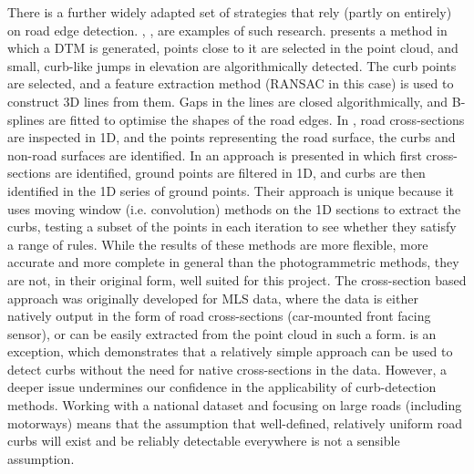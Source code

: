 There is a further widely adapted set of strategies that rely (partly on entirely) on road edge detection. \cite{vosselman_zhou_2009}, \cite{zhang_2010}, \cite{yang_etal_2013} are examples of such research. \cite{vosselman_zhou_2009} presents a method in which a DTM is generated, points close to it are selected in the point cloud, and small, curb-like jumps in elevation are algorithmically detected. The curb points are selected, and a feature extraction method (RANSAC in this case) is used to construct 3D lines from them. Gaps in the lines are closed algorithmically, and B-splines are fitted to optimise the shapes of the road edges. In \cite{zhang_2010}, road cross-sections are inspected in 1D, and the points representing the road surface, the curbs and non-road surfaces are identified. In \cite{yang_etal_2013} an approach is presented in which first cross-sections are identified, ground points are filtered in 1D, and curbs are then identified in the 1D series of ground points. Their approach is unique because it uses moving window (i.e. convolution) methods on the 1D sections to extract the curbs, testing a subset of the points in each iteration to see whether they satisfy a range of rules. While the results of these methods are more flexible, more accurate and more complete in general than the photogrammetric methods, they are not, in their original form, well suited for this project. The cross-section based approach was originally developed for MLS data, where the data is either natively output in the form of road cross-sections (car-mounted front facing sensor), or can be easily extracted from the point cloud in such a form. \cite{vosselman_zhou_2009} is an exception, which demonstrates that a relatively simple approach can be used to detect curbs without the need for native cross-sections in the data. However, a deeper issue undermines our confidence in the applicability of curb-detection methods. Working with a national dataset and focusing on large roads (including motorways) means that the assumption that well-defined, relatively uniform road curbs will exist and be reliably detectable everywhere is not a sensible assumption.

